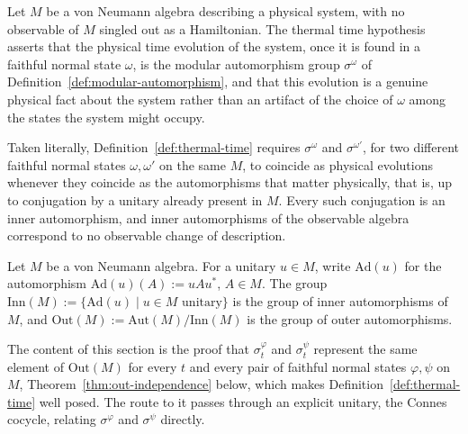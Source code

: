 \begin{definition}\label{def:thermal-time}
	Let $M$ be a von Neumann algebra describing a physical system, with no observable of $M$ singled out as a Hamiltonian. The thermal time hypothesis asserts that the physical time evolution of the system, once it is found in a faithful normal state $\omega$, is the modular automorphism group $\sigma^\omega$ of Definition~\ref{def:modular-automorphism}, and that this evolution is a genuine physical fact about the system rather than an artifact of the choice of $\omega$ among the states the system might occupy.
\end{definition}

Taken literally, Definition~\ref{def:thermal-time} requires $\sigma^\omega$ and $\sigma^{\omega'}$, for two different faithful normal states $\omega,\omega'$ on the same $M$, to coincide as physical evolutions whenever they coincide as the automorphisms that matter physically, that is, up to conjugation by a unitary already present in $M$. Every such conjugation is an inner automorphism, and inner automorphisms of the observable algebra correspond to no observable change of description.

\begin{definition}\label{def:inn-out}
	Let $M$ be a von Neumann algebra. For a unitary $u \in M$, write $\mathrm{Ad}(u)$ for the automorphism $\mathrm{Ad}(u)(A) := uAu^*$, $A \in M$. The group $\mathrm{Inn}(M) := \{\mathrm{Ad}(u) \mid u \in M \text{ unitary}\}$ is the group of inner automorphisms of $M$, and $\mathrm{Out}(M) := \mathrm{Aut}(M)/\mathrm{Inn}(M)$ is the group of outer automorphisms.
\end{definition}

The content of this section is the proof that $\sigma_t^\varphi$ and $\sigma_t^\psi$ represent the same element of $\mathrm{Out}(M)$ for every $t$ and every pair of faithful normal states $\varphi,\psi$ on $M$, Theorem~\ref{thm:out-independence} below, which makes Definition~\ref{def:thermal-time} well posed. The route to it passes through an explicit unitary, the Connes cocycle, relating $\sigma^\varphi$ and $\sigma^\psi$ directly.

